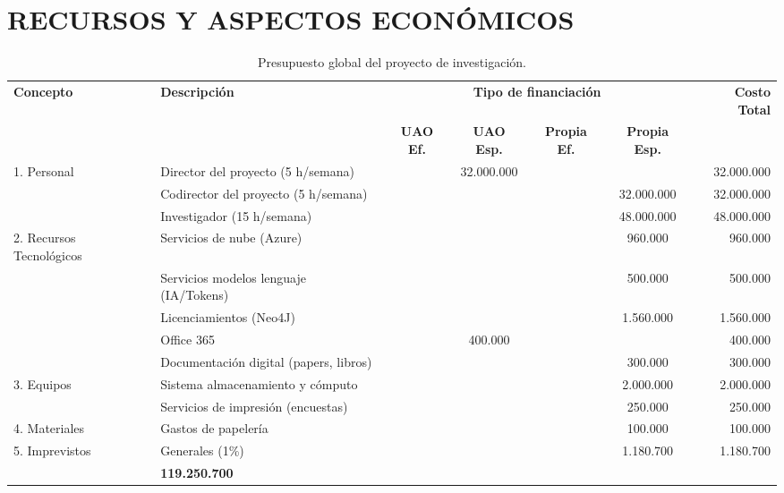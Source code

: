 \documentclass[12pt,letterpaper]{article}
\begin{document}
\newpage
\section{RECURSOS Y ASPECTOS ECONÓMICOS}
\vspace{-0.5cm}
\begin{table}[H]
\centering
\footnotesize
\setlength{\tabcolsep}{3pt}
\renewcommand{\arraystretch}{1.15}

\begin{tabularx}{\textwidth}{|p{2.8cm}|X|c|c|c|c|r|}
\hline
\rowcolor{azulUAO}
\color{white}\textbf{Concepto} &
\color{white}\textbf{Descripción} &
\multicolumn{4}{c|}{\color{white}\textbf{Tipo de financiación}} &
\color{white}\textbf{Costo Total} \\ \cline{3-6}

\rowcolor{azulUAO}
 & &
\color{white}\textbf{UAO Ef.} &
\color{white}\textbf{UAO Esp.} &
\color{white}\textbf{Propia Ef.} &
\color{white}\textbf{Propia Esp.} &
\\
\hline

1. Personal & Director del proyecto (5 h/semana) &  & 32.000.000 &  &  & 32.000.000 \\
 & Codirector del proyecto (5 h/semana) &  &  &  & 32.000.000 & 32.000.000 \\
 & Investigador (15 h/semana) &  &  &  & 48.000.000 & 48.000.000 \\
\hline

2. Recursos Tecnológicos & Servicios de nube (Azure) &  &  &  & 960.000 & 960.000 \\
 & Servicios modelos lenguaje (IA/Tokens) &  &  &  & 500.000 & 500.000 \\
 & Licenciamientos (Neo4J) &  &  &  & 1.560.000 & 1.560.000 \\
 & Office 365 &  & 400.000 &  &  & 400.000 \\
 & Documentación digital (papers, libros) &  &  &  & 300.000 & 300.000 \\
\hline

3. Equipos & Sistema almacenamiento y cómputo &  &  &  & 2.000.000 & 2.000.000 \\
 & Servicios de impresión (encuestas) &  &  &  & 250.000 & 250.000 \\
\hline

4. Materiales & Gastos de papelería &  &  &  & 100.000 & 100.000 \\
\hline

5. Imprevistos & Generales (1\%) &  &  &  & 1.180.700 & 1.180.700 \\
\hline

\rowcolor{azulUAO2}
\multicolumn{6}{|r|}{\textbf{COSTO TOTAL}} & \textbf{119.250.700} \\
\hline

\end{tabularx}
\caption{Presupuesto global del proyecto de investigación.}
\end{table}
\end{document}
